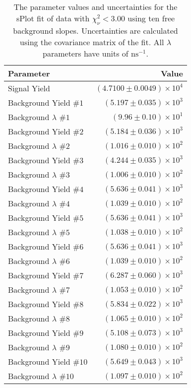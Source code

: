 
\begin{table}[ht]
    \begin{center}
        \begin{tabular}{lr}\toprule
            Parameter & Value \\\midrule
            Signal Yield & $(4.7100 \pm 0.0049) \times 10^{4}$ \\
            Background Yield $\#1$ & $(5.197 \pm 0.035) \times 10^{3}$ \\
            Background $\lambda$ $\#1$ & $(9.96 \pm 0.10) \times 10^{1}$ \\
            Background Yield $\#2$ & $(5.184 \pm 0.036) \times 10^{3}$ \\
            Background $\lambda$ $\#2$ & $(1.016 \pm 0.010) \times 10^{2}$ \\
            Background Yield $\#3$ & $(4.244 \pm 0.035) \times 10^{3}$ \\
            Background $\lambda$ $\#3$ & $(1.006 \pm 0.010) \times 10^{2}$ \\
            Background Yield $\#4$ & $(5.636 \pm 0.041) \times 10^{3}$ \\
            Background $\lambda$ $\#4$ & $(1.039 \pm 0.010) \times 10^{2}$ \\
            Background Yield $\#5$ & $(5.636 \pm 0.041) \times 10^{3}$ \\
            Background $\lambda$ $\#5$ & $(1.038 \pm 0.010) \times 10^{2}$ \\
            Background Yield $\#6$ & $(5.636 \pm 0.041) \times 10^{3}$ \\
            Background $\lambda$ $\#6$ & $(1.039 \pm 0.010) \times 10^{2}$ \\
            Background Yield $\#7$ & $(6.287 \pm 0.060) \times 10^{3}$ \\
            Background $\lambda$ $\#7$ & $(1.053 \pm 0.010) \times 10^{2}$ \\
            Background Yield $\#8$ & $(5.834 \pm 0.022) \times 10^{3}$ \\
            Background $\lambda$ $\#8$ & $(1.065 \pm 0.010) \times 10^{2}$ \\
            Background Yield $\#9$ & $(5.108 \pm 0.073) \times 10^{3}$ \\
            Background $\lambda$ $\#9$ & $(1.080 \pm 0.010) \times 10^{2}$ \\
            Background Yield $\#10$ & $(5.649 \pm 0.043) \times 10^{3}$ \\
            Background $\lambda$ $\#10$ & $(1.097 \pm 0.010) \times 10^{2}$ \\\bottomrule
        \end{tabular}
        \caption{The parameter values and uncertainties for the sPlot fit of data with $\chi^2_\nu < 3.00$ using ten free background slopes. Uncertainties are calculated using the covariance matrix of the fit. All $\lambda$ parameters have units of $\si{\nano\second}^{-1}$.}\label{tab:splot-fit-results-chisqdof-3.00-free-10}
    \end{center}
\end{table}
